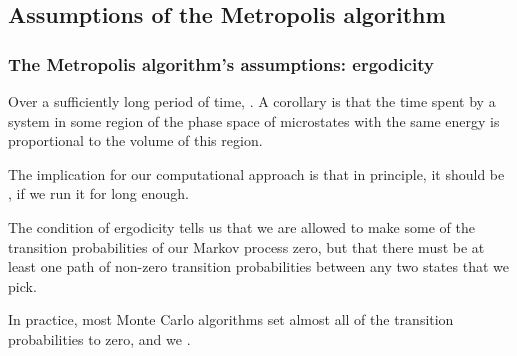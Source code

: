\documentclass[hyperref={colorlinks=true}]{beamer}
\begin{document}
\subsection[Assumptions of the Metropolis algorithm]{Assumptions of the Metropolis algorithm}

\begin{frame}%
  \frametitle{The Metropolis algorithm's assumptions: ergodicity}
  
  Over a sufficiently long period of time, . A corollary is that the time spent by a system in some region of the phase space of microstates with the same energy is proportional to the volume of this region. 

  \vspace{0.3cm}
  
  The implication for our computational approach is that in principle, it should be , if we run it for long enough. 
  
  \vspace{0.3cm}
  
  The condition of ergodicity tells us that we are allowed to make some of the transition probabilities of our Markov process zero, but that there must be at least one path of non-zero transition probabilities between any two states that we pick. 
  
  \vspace{0.3cm}
  
  In practice, most Monte Carlo algorithms set almost all of the transition probabilities to zero, and we .

\end{frame}

\end{document}
